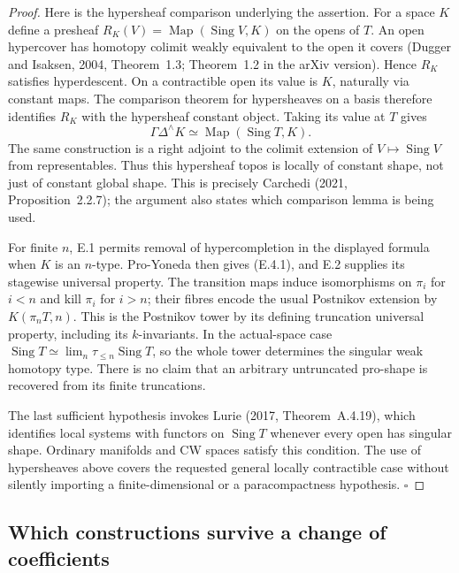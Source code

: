 \begin{proof}
Here is the hypersheaf comparison underlying the assertion. For a space $K$ define a presheaf
$R_K(V)=\operatorname{Map}(\operatorname{Sing}V,K)$ on the opens of $T$. An open hypercover has homotopy colimit weakly equivalent to the open it covers (Dugger and Isaksen, 2004, Theorem~1.3; Theorem~1.2 in the arXiv version). Hence $R_K$ satisfies hyperdescent. On a contractible open its value is $K$, naturally via constant maps. The comparison theorem for hypersheaves on a basis therefore identifies $R_K$ with the hypersheaf constant object. Taking its value at $T$ gives
\[
 \Gamma\Delta^\wedge K\simeq
                   \operatorname{Map}(\operatorname{Sing}T,K).
\]
The same construction is a right adjoint to the colimit extension of $V\mapsto\operatorname{Sing}V$ from representables. Thus this hypersheaf topos is locally of constant shape, not just of constant global shape. This is precisely Carchedi (2021, Proposition~2.2.7); the argument also states which comparison lemma is being used.

For finite $n$, E.1 permits removal of hypercompletion in the displayed formula when $K$ is an $n$-type. Pro-Yoneda then gives (E.4.1), and E.2 supplies its stagewise universal property. The transition maps induce isomorphisms on $\pi_i$ for $i<n$ and kill $\pi_i$ for $i>n$; their fibres encode the usual Postnikov extension by $K(\pi_nT,n)$. This is the Postnikov tower by its defining truncation universal property, including its $k$-invariants. In the actual-space case $\operatorname{Sing}T\simeq\lim_n\tau_{\le n}\operatorname{Sing}T$, so the whole tower determines the singular weak homotopy type. There is no claim that an arbitrary untruncated pro-shape is recovered from its finite truncations.

The last sufficient hypothesis invokes Lurie (2017, Theorem~A.4.19), which identifies local systems with functors on $\operatorname{Sing}T$ whenever every open has singular shape. Ordinary manifolds and CW spaces satisfy this condition. The use of hypersheaves above covers the requested general locally contractible case without silently importing a finite-dimensional or a paracompactness hypothesis. \hfill$\square$
\end{proof}

\subsection{Which constructions survive a change of coefficients}

